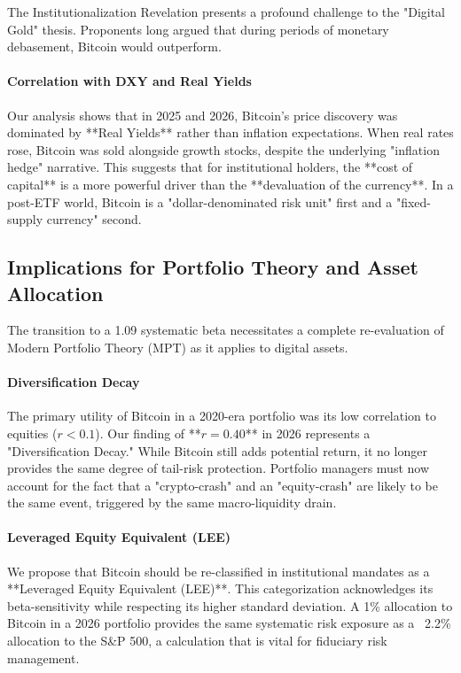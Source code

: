 \documentclass[10pt, conference, compsocconf]{IEEEtran}
\begin{document}
The Institutionalization Revelation presents a profound challenge to the "Digital Gold" thesis. Proponents long argued that during periods of monetary debasement, Bitcoin would outperform. 

\paragraph{Correlation with DXY and Real Yields}
Our analysis shows that in 2025 and 2026, Bitcoin’s price discovery was dominated by **Real Yields** rather than inflation expectations. When real rates rose, Bitcoin was sold alongside growth stocks, despite the underlying "inflation hedge" narrative. This suggests that for institutional holders, the **cost of capital** is a more powerful driver than the **devaluation of the currency**. In a post-ETF world, Bitcoin is a "dollar-denominated risk unit" first and a "fixed-supply currency" second.


\subsection{Implications for Portfolio Theory and Asset Allocation}

The transition to a 1.09 systematic beta necessitates a complete re-evaluation of Modern Portfolio Theory (MPT) as it applies to digital assets.

\paragraph{Diversification Decay}
The primary utility of Bitcoin in a 2020-era portfolio was its low correlation to equities ($r < 0.1$). Our finding of **$r=0.40$** in 2026 represents a "Diversification Decay." While Bitcoin still adds potential return, it no longer provides the same degree of tail-risk protection. Portfolio managers must now account for the fact that a "crypto-crash" and an "equity-crash" are likely to be the same event, triggered by the same macro-liquidity drain.

\paragraph{Leveraged Equity Equivalent (LEE)}
We propose that Bitcoin should be re-classified in institutional mandates as a **Leveraged Equity Equivalent (LEE)**. This categorization acknowledges its beta-sensitivity while respecting its higher standard deviation. A 1\% allocation to Bitcoin in a 2026 portfolio provides the same systematic risk exposure as a ~2.2\% allocation to the S\&P 500, a calculation that is vital for fiduciary risk management.
\end{document}

